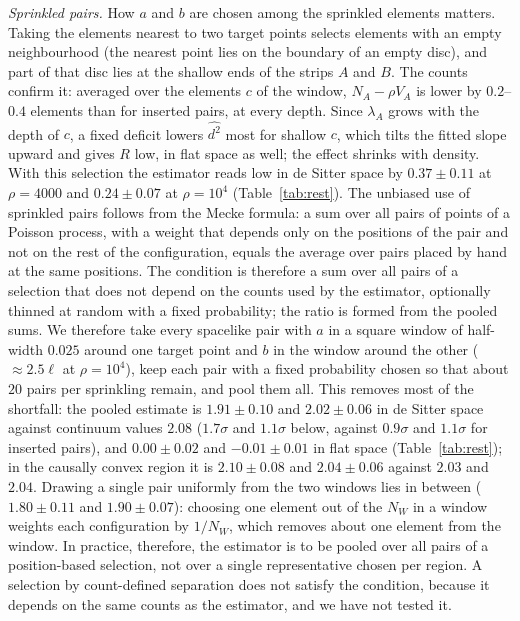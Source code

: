 \documentclass[prd,twocolumn,superscriptaddress,nofootinbib,amsmath,amssymb,floatfix]{revtex4-2}
\providecommand{\DIFaddtex}[1]{{\protect\color{blue}\uwave{#1}}} %
\providecommand{\DIFaddbegin}{} %
\providecommand{\DIFaddend}{} %
\providecommand{\DIFadd}[1]{\texorpdfstring{\DIFaddtex{#1}}{#1}} %
\providecommand{\DIFaddincludegraphics}[2][]{{\color{blue}\fbox{\DIFOincludegraphics[#1]{#2}}}} %
\DeclareRobustCommand{\DIFaddbegin}{\DIFOaddbegin \let\includegraphics\DIFaddincludegraphics} %
\DeclareRobustCommand{\DIFaddend}{\DIFOaddend \let\includegraphics\DIFOincludegraphics} %
\begin{document}
\emph{Sprinkled pairs.} How $a$ and $b$ are chosen among the sprinkled elements matters. Taking the elements nearest to two target points selects elements with an empty neighbourhood (the nearest point lies on the boundary of an empty disc), and part of that disc lies at the shallow ends of the strips $A$ and $B$. The counts confirm it: averaged over the elements $c$ of the window, $N_A-\rho V_A$ is lower by $0.2$--$0.4$ elements than for inserted pairs, at every depth. Since $\lambda_A$ grows with the depth of $c$, a fixed deficit lowers $\widehat{d^2}$ most for shallow $c$, which tilts the fitted slope upward and gives $R$ low, in flat space as well; the effect shrinks with density. With this selection the estimator reads low in de Sitter space by $0.37\pm0.11$ at $\rho=4000$ and $0.24\pm0.07$ at $\rho=10^4$ (Table~\ref{tab:rest}). The unbiased use of sprinkled pairs follows from the Mecke formula\DIFaddbegin \DIFadd{~\mbox{%
\cite{LastPenrose17}}\hskip0pt%
}\DIFaddend : a sum over all pairs of points of a Poisson process, with a weight that depends only on the positions of the pair and not on the rest of the configuration, equals the average over pairs placed by hand at the same positions. The condition is therefore a sum over all pairs of a selection that does not depend on the counts used by the estimator, optionally thinned at random with a fixed probability; the ratio is formed from the pooled sums. We therefore take every spacelike pair with $a$ in a square window of half-width $0.025$ around one target point and $b$ in the window around the other ($\approx2.5\ell$ at $\rho=10^4$), keep each pair with a fixed probability chosen so that about $20$ pairs per sprinkling remain, and pool them all. This removes most of the shortfall: the pooled estimate is $1.91\pm0.10$ and $2.02\pm0.06$ in de Sitter space against continuum values $2.08$ ($1.7\sigma$ and $1.1\sigma$ below, against $0.9\sigma$ and $1.1\sigma$ for inserted pairs), and $0.00\pm0.02$ and $-0.01\pm0.01$ in flat space (Table~\ref{tab:rest}); in the causally convex region it is $2.10\pm0.08$ and $2.04\pm0.06$ against $2.03$ and $2.04$. Drawing a single pair uniformly from the two windows lies in between ($1.80\pm0.11$ and $1.90\pm0.07$): choosing one element out of the $N_W$ in a window weights each configuration by $1/N_W$, which removes about one element from the window. In practice, therefore, the estimator is to be pooled over all pairs of a position-based selection, not over a single representative chosen per region. A selection by count-defined separation does not satisfy the condition, because it depends on the same counts as the estimator, and we have not tested it.
\end{document}
